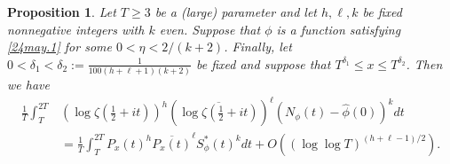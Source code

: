\documentclass[12pt,oneside,english,a4paper]{amsart}
\newtheorem{prop}[thm]{Proposition}
\theoremstyle{remark}
\numberwithin{equation}{section}
\newcommand{\Starphi}{S_\phi^*}
\begin{document}
\begin{prop}\label{PropApprox}
    Let $T \ge 3$ be a (large) parameter and let $h,\ell,k$ be fixed nonnegative integers with $k$ even. Suppose that $\phi$ is a function satisfying \eqref{24may.1} for some $0<\eta<2/(k+2)$. Finally, let $0 < \delta_1 < \delta_2 := \tfrac{1}{100(h+\ell+1)(k+2)}$ be fixed and suppose that $T^{\delta_1} \le x \le T^{\delta_2}$. Then we have
    \begin{align*}
        \frac{1}{T} \int_T^{2T} &(\log\zeta(\tfrac{1}{2}+it))^h (\overline{\log\zeta(\tfrac{1}{2}+it)} )^\ell (N_\phi(t)-\hat\phi(0))^k dt \\
        &= \frac{1}{T}\int_T^{2T} P_x(t)^h \overline{P_x(t)}^\ell \Starphi(t)^k dt 
        +O\left( (\log\log T)^{(h+\ell-1)/2} \right).
    \end{align*}
\end{prop}
\end{document}
